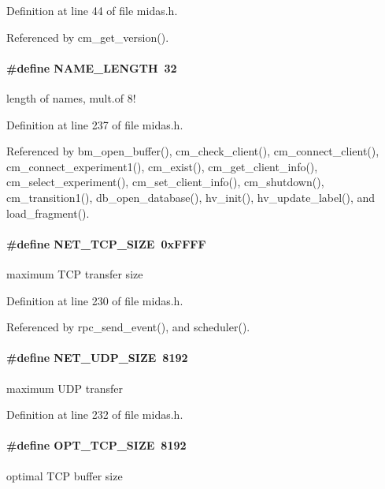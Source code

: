 Definition at line 44 of file midas.h.

Referenced by cm\_\-get\_\-version().
\paragraph[{NAME\_\-LENGTH}]{\setlength{\rightskip}{0pt plus 5cm}\#define NAME\_\-LENGTH~32}\hfill\label{group__midasincludecode_gaf71324c57f05ff9e24bd384925dd6b17}
length of names, mult.of 8! 

Definition at line 237 of file midas.h.

Referenced by bm\_\-open\_\-buffer(), cm\_\-check\_\-client(), cm\_\-connect\_\-client(), cm\_\-connect\_\-experiment1(), cm\_\-exist(), cm\_\-get\_\-client\_\-info(), cm\_\-select\_\-experiment(), cm\_\-set\_\-client\_\-info(), cm\_\-shutdown(), cm\_\-transition1(), db\_\-open\_\-database(), hv\_\-init(), hv\_\-update\_\-label(), and load\_\-fragment().
\paragraph[{NET\_\-TCP\_\-SIZE}]{\setlength{\rightskip}{0pt plus 5cm}\#define NET\_\-TCP\_\-SIZE~0xFFFF}\hfill\label{group__midasincludecode_ga31190e25ed33be085ff0af476af2c029}
maximum TCP transfer size 

Definition at line 230 of file midas.h.

Referenced by rpc\_\-send\_\-event(), and scheduler().
\paragraph[{NET\_\-UDP\_\-SIZE}]{\setlength{\rightskip}{0pt plus 5cm}\#define NET\_\-UDP\_\-SIZE~8192}\hfill\label{group__midasincludecode_ga75d12e6b30368bb9a7f214430c6e76a6}
maximum UDP transfer 

Definition at line 232 of file midas.h.
\paragraph[{OPT\_\-TCP\_\-SIZE}]{\setlength{\rightskip}{0pt plus 5cm}\#define OPT\_\-TCP\_\-SIZE~8192}\hfill\label{group__midasincludecode_ga2d57fe25161f9e5285d9bafd7fb0775d}
optimal TCP buffer size 

